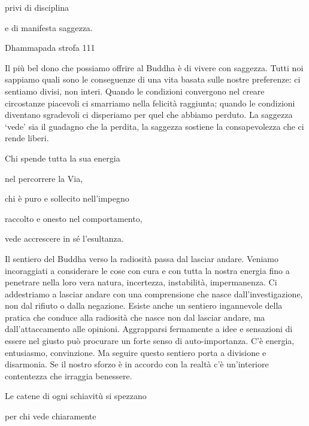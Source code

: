 \documentclass[a4paper,portrait,12pt]{article}
\begin{document}
privi di disciplina	


e di manifesta saggezza. 





Dhammapada strofa 111


\newpage



Il più bel dono che possiamo offrire al Buddha \`{e} di vivere con saggezza. Tutti noi sappiamo quali sono le conseguenze di una vita basata sulle nostre preferenze: ci sentiamo divisi, non interi. Quando le condizioni convergono nel creare circostanze piacevoli ci smarriamo nella felicit\`{a} raggiunta; quando le condizioni diventano sgradevoli ci disperiamo per quel che abbiamo perduto. La saggezza `vede' sia il guadagno che la perdita, la saggezza sostiene la consapevolezza che ci rende liberi.


\newpage



Chi spende tutta la sua energia


nel percorrere la Via,


chi \`{e} puro e sollecito nell'impegno


raccolto e onesto nel comportamento,


vede accrescere in s\'{e} l'esultanza. 


\newpage



Il sentiero del Buddha verso la radiosit\`{a} passa dal lasciar andare. Veniamo incoraggiati a considerare le cose con cura e con tutta la nostra energia fino a penetrare nella loro vera natura, incertezza, instabilit\`{a}, impermanenza. Ci addestriamo a lasciar andare con una comprensione che nasce dall'investigazione, non dal rifiuto o dalla negazione. Esiste anche un sentiero ingannevole della pratica che conduce alla radiosit\`{a} che nasce non dal lasciar andare, ma dall'attaccamento alle opinioni. Aggrapparsi fermamente a idee e sensazioni di essere nel giusto pu\`{o} procurare un forte senso di auto-importanza. C'\`{e} energia, entusiasmo, convinzione. Ma seguire questo sentiero porta a divisione e disarmonia. Se il nostro sforzo \`{e} in accordo con la realt\`{a} c'\`{e} un'interiore contentezza che irraggia benessere.


\newpage



Le catene di ogni schiavitù si spezzano


per chi vede chiaramente
\end{document}

